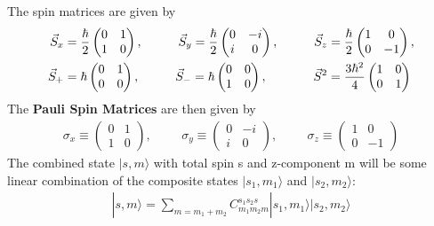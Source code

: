 The spin matrices are given by
\begin{align}
\vec{S}_x &= \frac{\hbar}{2}\begin{pmatrix}
0 & 1 \\ 1 & 0
\end{pmatrix}, \hspace{1cm}\vec{S}_y = \frac{\hbar}{2}\begin{pmatrix}
0 & -i \\ i & 0
\end{pmatrix}, \hspace{1cm}\vec{S}_z = \frac{\hbar}{2}\begin{pmatrix}
1 & 0 \\ 0 & -1
\end{pmatrix}, \\ \vec{S}_+ &= \hbar\begin{pmatrix}
0 & 1 \\ 0 & 0
\end{pmatrix}, \hspace{1cm}\vec{S}_- = \hbar\begin{pmatrix}
0 & 0 \\ 1 & 0
\end{pmatrix}, \hspace{1.3cm}\vec{S}^2 = \frac{3\hbar^2}{4}\begin{pmatrix}
1 & 0 \\ 0 & 1
\end{pmatrix}
\end{align}
The \textbf{Pauli Spin Matrices} are then given by
\begin{align}
\sigma_x \equiv \begin{pmatrix}
0 & 1 \\ 1 & 0
\end{pmatrix}, \hspace{1cm}\sigma_y \equiv \begin{pmatrix}
0 & -i \\ i & 0
\end{pmatrix}, \hspace{1cm}\sigma_z \equiv \begin{pmatrix}
1 & 0 \\ 0 & -1
\end{pmatrix}
\end{align}
The combined state $| s, m \rangle$  with total spin s and z-component m will be some linear combination of the composite states $| s_1, m_1 \rangle$ and $| s_2, m_2 \rangle$:
\begin{align}
| s, m \rangle = \sum_{m=m_1+m_2} C_{m_1m_2m}^{s_1s_2s}| s_1, m_1 \rangle| s_2, m_2 \rangle
\end{align}

